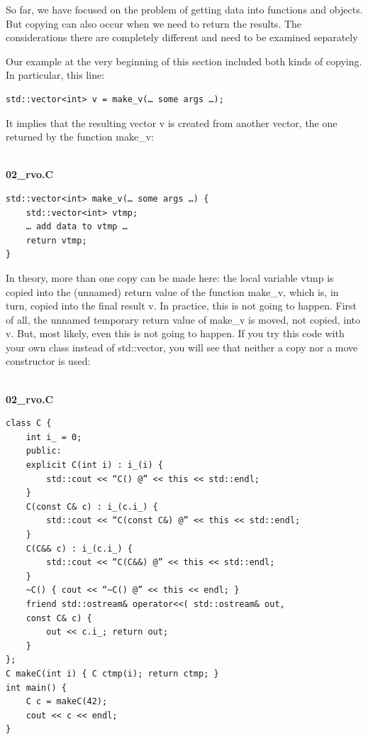 So far, we have focused on the problem of getting data into functions and objects. But copying can also occur when we need to return the results. The considerations there are completely different and need to be examined separately


Our example at the very beginning of this section included both kinds of copying. In particular, this line:

\begin{lstlisting}[style=styleCXX]
std::vector<int> v = make_v(… some args …);
\end{lstlisting}

It implies that the resulting vector v is created from another vector, the one returned by the function make\_v:

\hspace*{\fill} \\ %
\noindent
\textbf{02\_rvo.C}
\begin{lstlisting}[style=styleCXX]
std::vector<int> make_v(… some args …) {
	std::vector<int> vtmp;
	… add data to vtmp …
	return vtmp;
}
\end{lstlisting}

In theory, more than one copy can be made here: the local variable vtmp is copied into the (unnamed) return value of the function make\_v, which is, in turn, copied into the final result v. In practice, this is not going to happen. First of all, the unnamed temporary return value of make\_v is moved, not copied, into v. But, most likely, even this is not going to happen. If you try this code with your own class instead of std::vector, you will see that neither a copy nor a move constructor is used:

\hspace*{\fill} \\ %
\noindent
\textbf{02\_rvo.C}
\begin{lstlisting}[style=styleCXX]
class C {
	int i_ = 0;
	public:
	explicit C(int i) : i_(i) { 
		std::cout << “C() @” << this << std::endl;
	}
	C(const C& c) : i_(c.i_) {
		std::cout << “C(const C&) @” << this << std::endl;
	}
	C(C&& c) : i_(c.i_) {
		std::cout << “C(C&&) @” << this << std::endl;
	}
	~C() { cout << “~C() @” << this << endl; }
	friend std::ostream& operator<<( std::ostream& out,
	const C& c) {
		out << c.i_; return out;
	}
};  
C makeC(int i) { C ctmp(i); return ctmp; }
int main() {
	C c = makeC(42);
	cout << c << endl;
}
\end{lstlisting}

